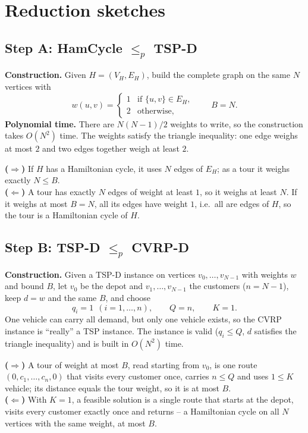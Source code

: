 \documentclass[11pt,a4paper]{article}
\newcommand{\cvrpd}{\mbox{CVRP-D}}
\newcommand{\tspd}{\mbox{TSP-D}}
\newcommand{\hc}{\mbox{HamCycle}}
\begin{document}
\section{Reduction sketches}

\subsection{\texorpdfstring{Step A: \hc{} $\le_p$ \tspd}{Step A: HamCycle to TSP-D}}
\textbf{Construction.} Given $H=(V_H,E_H)$, build the complete graph on the same $N$
vertices with
\[
w(u,v)=\begin{cases}1 & \text{if } \{u,v\}\in E_H,\\ 2 & \text{otherwise,}\end{cases}
\qquad B=N .
\]
\textbf{Polynomial time.} There are $N(N-1)/2$ weights to write, so the construction takes
$O(N^2)$ time. The weights satisfy the triangle inequality: one edge weighs at most $2$
and two edges together weigh at least $2$.

\textbf{($\Rightarrow$)} If $H$ has a Hamiltonian cycle, it uses $N$ edges of $E_H$; as a
tour it weighs exactly $N\le B$.\\
\textbf{($\Leftarrow$)} A tour has exactly $N$ edges of weight at least $1$, so it weighs at
least $N$. If it weighs at most $B=N$, all its edges have weight $1$, i.e.\ all are edges
of $H$, so the tour is a Hamiltonian cycle of $H$.

\subsection{\texorpdfstring{Step B: \tspd{} $\le_p$ \cvrpd}{Step B: TSP-D to CVRP-D}}
\textbf{Construction.} Given a \tspd{} instance on vertices $v_0,\dots,v_{N-1}$ with
weights $w$ and bound $B$, let $v_0$ be the depot and $v_1,\dots,v_{N-1}$ the customers
($n=N-1$), keep $d=w$ and the same $B$, and choose
\[
q_i=1\ \ (i=1,\dots,n),\qquad Q=n,\qquad K=1 .
\]
One vehicle can carry all demand, but only one vehicle exists, so the CVRP instance is
``really'' a TSP instance. The instance is valid ($q_i\le Q$, $d$ satisfies the triangle
inequality) and is built in $O(N^2)$ time.

\textbf{($\Rightarrow$)} A tour of weight at most $B$, read starting from $v_0$, is one route
$(0,c_1,\dots,c_n,0)$ that visits every customer once, carries $n\le Q$ and uses
$1\le K$ vehicle; its distance equals the tour weight, so it is at most $B$.\\
\textbf{($\Leftarrow$)} With $K=1$, a feasible solution is a single route that starts at
the depot, visits every customer exactly once and returns -- a Hamiltonian cycle on all
$N$ vertices with the same weight, at most $B$.
\end{document}
